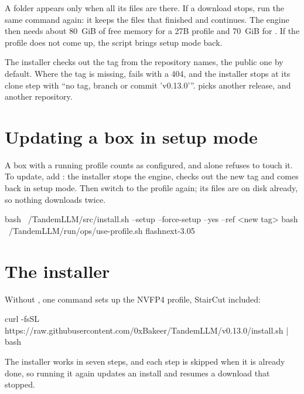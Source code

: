 A folder appears only when all its files are there. If a download stops, run the same command again: it keeps the files that finished and continues. The engine then needs about 80~GiB of free memory for a 27B profile and 70~GiB for . If the profile does not come up, the script brings setup mode back.

The installer checks out the tag  from the repository  names, the public one by default. Where the tag is missing,  fails with a 404, and the installer stops at its clone step with \enquote{no tag, branch or commit 'v0.13.0'}.  picks another release, and  another repository.

\section{Updating a box in setup mode}\label{sec:update-setup}

A box with a running profile counts as configured, and  alone refuses to touch it. To update, add : the installer stops the engine, checks out the new tag and comes back in setup mode. Then switch to the profile again; its files are on disk already, so nothing downloads twice.

\begin{shell}
bash ~/TandemLLM/src/install.sh --setup --force-setup --yes --ref <new tag>
bash ~/TandemLLM/run/ops/use-profile.sh flashnext-3.05
\end{shell}

\section{The installer}

Without , one command sets up the NVFP4 profile, StairCut included:

\begin{shell}
curl -fsSL https://raw.githubusercontent.com/0xBakeer/TandemLLM/v0.13.0/install.sh | bash
\end{shell}

The installer works in seven steps, and each step is skipped when it is already done, so running it again updates an install and resumes a download that stopped.

